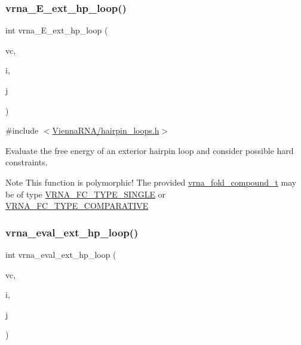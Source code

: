 \subsubsection{\texorpdfstring{vrna\+\_\+\+E\+\_\+ext\+\_\+hp\+\_\+loop()}{vrna\_E\_ext\_hp\_loop()}}
{\footnotesize\ttfamily int vrna\+\_\+\+E\+\_\+ext\+\_\+hp\+\_\+loop (\begin{DoxyParamCaption}\item[{\mbox{\hyperlink{group__fold__compound_ga1b0cef17fd40466cef5968eaeeff6166}{vrna\+\_\+fold\+\_\+compound\+\_\+t}} $\ast$}]{vc,  }\item[{int}]{i,  }\item[{int}]{j }\end{DoxyParamCaption})}



{\ttfamily \#include $<$\mbox{\hyperlink{hairpin__loops_8h}{Vienna\+R\+N\+A/hairpin\+\_\+loops.\+h}}$>$}



Evaluate the free energy of an exterior hairpin loop and consider possible hard constraints. 

\begin{DoxyNote}{Note}
This function is polymorphic! The provided \mbox{\hyperlink{group__fold__compound_ga1b0cef17fd40466cef5968eaeeff6166}{vrna\+\_\+fold\+\_\+compound\+\_\+t}} may be of type \mbox{\hyperlink{group__fold__compound_gga01a4ff86fa71deaaa5d1abbd95a1447da7e264dd3cf2dc9b6448caabcb7763cd6}{V\+R\+N\+A\+\_\+\+F\+C\+\_\+\+T\+Y\+P\+E\+\_\+\+S\+I\+N\+G\+LE}} or \mbox{\hyperlink{group__fold__compound_gga01a4ff86fa71deaaa5d1abbd95a1447dab821ce46ea3cf665be97df22a76f5023}{V\+R\+N\+A\+\_\+\+F\+C\+\_\+\+T\+Y\+P\+E\+\_\+\+C\+O\+M\+P\+A\+R\+A\+T\+I\+VE}} 
\end{DoxyNote}
\mbox{\label{group__loops_gad3b92453a6b501856eec8fae39f3235d}} 
\subsubsection{\texorpdfstring{vrna\+\_\+eval\+\_\+ext\+\_\+hp\+\_\+loop()}{vrna\_eval\_ext\_hp\_loop()}}
{\footnotesize\ttfamily int vrna\+\_\+eval\+\_\+ext\+\_\+hp\+\_\+loop (\begin{DoxyParamCaption}\item[{\mbox{\hyperlink{group__fold__compound_ga1b0cef17fd40466cef5968eaeeff6166}{vrna\+\_\+fold\+\_\+compound\+\_\+t}} $\ast$}]{vc,  }\item[{int}]{i,  }\item[{int}]{j }\end{DoxyParamCaption})}



